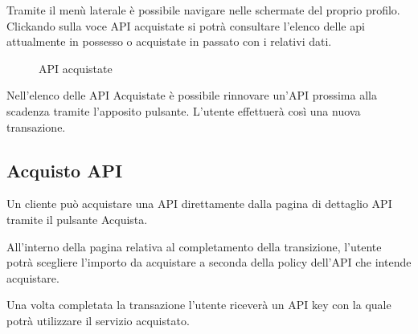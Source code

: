 Tramite il menù laterale è possibile navigare nelle schermate del proprio profilo. Clickando sulla voce API acquistate si potrà consultare l'elenco delle api attualmente in possesso o acquistate in passato con i relativi dati. 

\label{API acquistate}
\begin{figure}[H]
	\centering
	\caption{API acquistate}
\end{figure}
Nell'elenco delle API Acquistate è possibile rinnovare un'API prossima alla scadenza tramite l'apposito pulsante. L'utente effettuerà così una nuova transazione.


\subsection{Acquisto API}
Un cliente può acquistare una API direttamente dalla pagina di dettaglio API tramite il pulsante Acquista. 

All'interno della pagina relativa al completamento della transizione, l'utente potrà scegliere l'importo da acquistare a seconda della policy dell'API che intende acquistare.  

Una volta completata la transazione l'utente riceverà un API key con la quale potrà utilizzare il servizio acquistato. 

